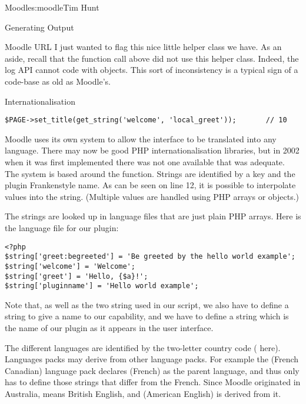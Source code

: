 \begin{aosachapter}{Moodle}{s:moodle}{Tim Hunt}
\begin{aosasect1}{Generating Output}
\begin{aosasect2}{Moodle URL}
I just wanted to flag this nice little helper class we have. As an
aside, recall that the  function call above did not
use this helper class. Indeed, the log API cannot code with
 objects. This sort of inconsistency is a typical
sign of a code-base as old as Moodle's.

\end{aosasect2}

\begin{aosasect2}{Internationalisation}

\begin{verbatim}
$PAGE->set_title(get_string('welcome', 'local_greet'));       // 10
\end{verbatim}

Moodle uses its own system to allow the interface to be translated
into any language. There may now be good PHP internationalisation
libraries, but in 2002 when it was first implemented there was not one
available that was adequate. The system is based around the
 function. Strings are identified by a key and the
plugin Frankenstyle name. As can be seen on line 12, it is possible to
interpolate values into the string. (Multiple values are handled using
PHP arrays or objects.)

The strings are looked up in language files that are just plain PHP
arrays. Here is the language file
 for our plugin:

\begin{verbatim}
<?php
$string['greet:begreeted'] = 'Be greeted by the hello world example';
$string['welcome'] = 'Welcome';
$string['greet'] = 'Hello, {$a}!';
$string['pluginname'] = 'Hello world example';
\end{verbatim}

Note that, as well as the two string used in our script, we also have
to define a string to give a name to our capability, and we have to
define a string  which is the name of our plugin as
it appears in the user interface.

The different languages are identified by the two-letter country code
( here). Languages packs may derive from other language
packs. For example the  (French Canadian) language pack
declares  (French) as the parent language, and thus only has
to define those strings that differ from the French. Since Moodle
originated in Australia,  means British English, and
 (American English) is derived from it.


\end{aosasect2}
\end{aosasect1}
\end{aosachapter}
